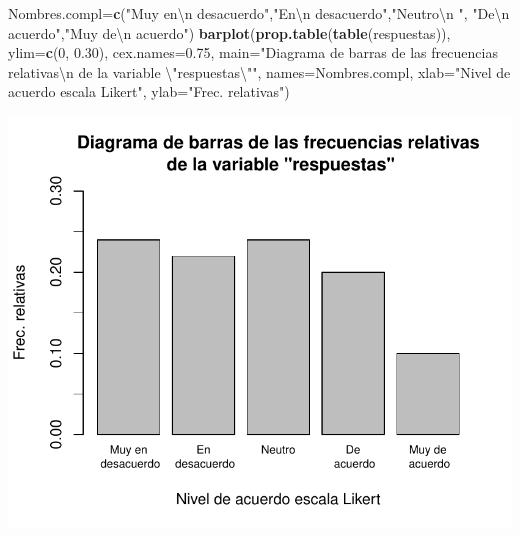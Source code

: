 \documentclass[
]{book}
\newenvironment{Shaded}{\begin{snugshade}}{\end{snugshade}}
\newcommand{\CharTok}[1]{\textcolor[rgb]{0.31,0.60,0.02}{#1}}
\newcommand{\DataTypeTok}[1]{\textcolor[rgb]{0.13,0.29,0.53}{#1}}
\newcommand{\DecValTok}[1]{\textcolor[rgb]{0.00,0.00,0.81}{#1}}
\newcommand{\FloatTok}[1]{\textcolor[rgb]{0.00,0.00,0.81}{#1}}
\newcommand{\KeywordTok}[1]{\textcolor[rgb]{0.13,0.29,0.53}{\textbf{#1}}}
\newcommand{\NormalTok}[1]{#1}
\newcommand{\StringTok}[1]{\textcolor[rgb]{0.31,0.60,0.02}{#1}}
\theoremstyle{definition}
\theoremstyle{definition}
\theoremstyle{definition}
\theoremstyle{remark}
\begin{document}
\begin{Shaded}
\begin{Highlighting}[]
\NormalTok{Nombres.compl=}\KeywordTok{c}\NormalTok{(}\StringTok{"Muy en}\CharTok{\textbackslash{}n}\StringTok{ desacuerdo"}\NormalTok{,}\StringTok{"En}\CharTok{\textbackslash{}n}\StringTok{ desacuerdo"}\NormalTok{,}\StringTok{"Neutro}\CharTok{\textbackslash{}n}\StringTok{ "}\NormalTok{,}
                \StringTok{"De}\CharTok{\textbackslash{}n}\StringTok{ acuerdo"}\NormalTok{,}\StringTok{"Muy de}\CharTok{\textbackslash{}n}\StringTok{ acuerdo"}\NormalTok{)}
\KeywordTok{barplot}\NormalTok{(}\KeywordTok{prop.table}\NormalTok{(}\KeywordTok{table}\NormalTok{(respuestas)), }\DataTypeTok{ylim=}\KeywordTok{c}\NormalTok{(}\DecValTok{0}\NormalTok{, }\FloatTok{0.30}\NormalTok{), }\DataTypeTok{cex.names=}\FloatTok{0.75}\NormalTok{,}
  \DataTypeTok{main=}\StringTok{"Diagrama de barras de las frecuencias relativas}\CharTok{\textbackslash{}n}\StringTok{ de la variable }\CharTok{\textbackslash{}"}\StringTok{respuestas}\CharTok{\textbackslash{}"}\StringTok{"}\NormalTok{, }
  \DataTypeTok{names=}\NormalTok{Nombres.compl, }\DataTypeTok{xlab=}\StringTok{"Nivel de acuerdo escala Likert"}\NormalTok{,  }\DataTypeTok{ylab=}\StringTok{"Frec. relativas"}\NormalTok{)}
\end{Highlighting}
\end{Shaded}

\begin{center}\includegraphics[width=0.9\linewidth]{11chap11_Descripcion_ordinales_files/figure-latex/unnamed-chunk-14-1} \end{center}
\end{document}
